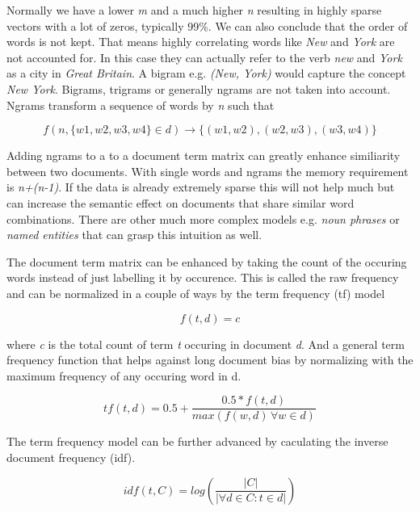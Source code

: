     Normally we have a lower \emph{m} and a much higher \emph{n} resulting in highly sparse vectors with a lot of zeros, typically 99\%. We can also conclude that the order of words is not kept. That means highly correlating words like \emph{New} and \emph{York} are not accounted for. In this case they can actually refer to the verb \emph{new} and \emph{York} as a city in \emph{Great Britain}. A bigram e.g. \emph{(New, York)} would capture the concept \emph{New York}. Bigrams, trigrams or generally ngrams are not taken into account. Ngrams transform a sequence of words by \emph{n} such that 

      \begin{equation}
        f(n, \{w1, w2, w3, w4\} \in d) \to \{(w1, w2),(w2,w3),(w3,w4)\}
      \end{equation}

    Adding ngrams to a to a document term matrix can greatly enhance similiarity between two documents. With single words and ngrams the memory requirement is \emph{n+(n-1)}. If the data is already extremely sparse this will not help much but can increase the semantic effect on documents that share similar word combinations. There are other much more complex models e.g. \emph{noun phrases} or \emph{named entities} that can grasp this intuition as well.

    The document term matrix can be enhanced by taking the count of the occuring words instead of just labelling it by occurence. This is called the raw frequency and can be normalized in a couple of ways by the term frequency (tf) model
     
      \begin{equation}
        f(t,d) = c
      \end{equation}

    where \emph{c} is the total count of term \emph{t} occuring in document \emph{d}.
    And a general term frequency function that helps against long document bias by normalizing with the maximum frequency of any occuring word in d.

    \begin{equation}
      tf(t,d) = 0.5 + \frac{0.5 * f(t,d)}{max(f(w,d)\, \forall w \in d)}
    \end{equation}

    The term frequency model can be further advanced by caculating the inverse document frequency (idf).

    \begin{equation}
      idf(t, C) = log(\frac{|C|}{|\forall d \in C : t \in d|})
    \end{equation}

